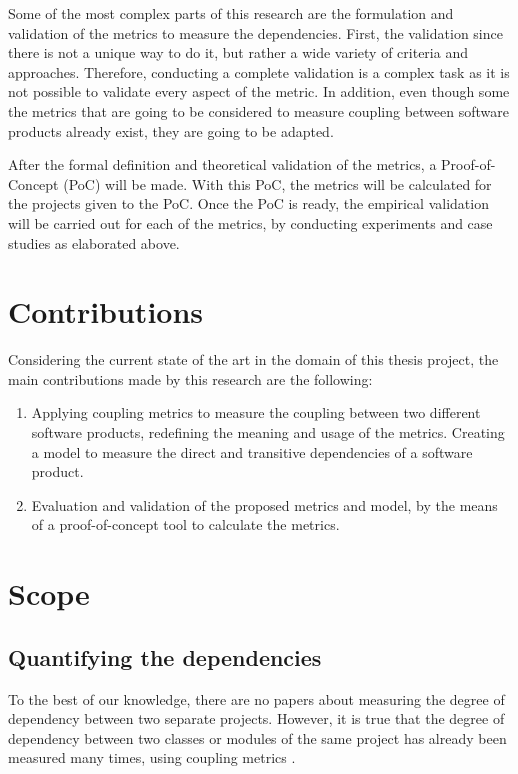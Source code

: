 \blankl
Some of the most complex parts of this research are the formulation and validation of the metrics to measure the dependencies.
First, the validation since there is not a unique way to do it, but rather a wide variety of criteria and approaches. Therefore, conducting a complete validation is a complex task as it is not possible to validate every aspect of the metric.
In addition, even though some the metrics that are going to be considered to measure coupling between software products already exist, they are going to be adapted.

\blankl
After the formal definition and theoretical validation of the metrics, a Proof-of-Concept (PoC) will be made. With this PoC, the metrics will be calculated for the projects given to the PoC. Once the PoC is ready, the empirical validation will be carried out for each of the metrics, by conducting experiments and case studies as elaborated above.

\section{Contributions} %
Considering the current state of the art in the domain of this thesis project, the main contributions made by this research are the following:

\begin{enumerate}
	\item Applying coupling metrics to measure the coupling between two different software products, redefining the meaning and usage of the metrics. Creating a model to measure the direct and transitive dependencies of a software product.
  \blankls

	\item Evaluation and validation of the proposed metrics and model, by the means of a proof-of-concept tool to calculate the metrics.
\end{enumerate}

\section{Scope}\label{section:scope}
\subsection{Quantifying the dependencies}
To the best of our knowledge, there are no papers about measuring the degree of dependency between two separate projects. However, it is true that the degree of dependency between two classes or modules of the same project has already been measured many times, using coupling metrics \cite{briand1999unified}.


